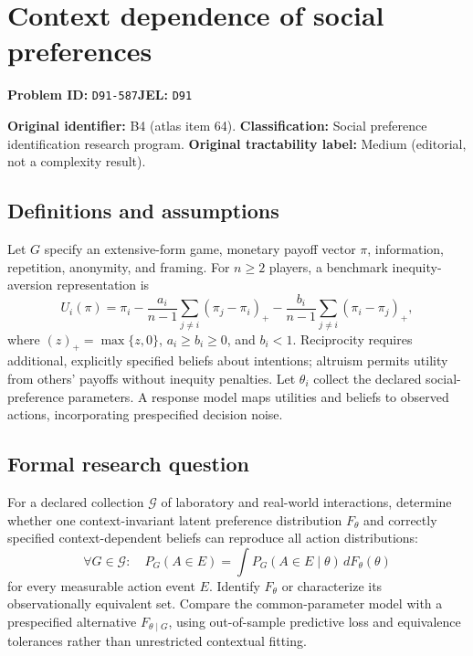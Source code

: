 \documentclass[11pt,a4paper]{article}
\begin{document}
\section*{Context dependence of social preferences}
\textbf{Problem ID:} \texttt{D91-587}\quad \textbf{JEL:} \texttt{D91}\par
\label{problem:OP-0064}
\label{atlas:prob:B4}

\noindent\textbf{Original identifier:} B4 (atlas item 64). \textbf{Classification:} Social preference identification research program. \textbf{Original tractability label:} Medium (editorial, not a complexity result).

\subsection*{Definitions and assumptions}

Let $G$ specify an extensive-form game, monetary payoff vector $\pi$, information, repetition, anonymity, and framing. For $n\geq2$ players, a benchmark inequity-aversion representation is
\[
U_i(\pi)=\pi_i-\frac{a_i}{n-1}\sum_{j\ne i}(\pi_j-\pi_i)_+
-\frac{b_i}{n-1}\sum_{j\ne i}(\pi_i-\pi_j)_+,
\]
where $(z)_+=\max\{z,0\}$, $a_i\geq b_i\geq0$, and $b_i<1$. Reciprocity requires additional, explicitly specified beliefs about intentions; altruism permits utility from others' payoffs without inequity penalties. Let $\theta_i$ collect the declared social-preference parameters. A response model maps utilities and beliefs to observed actions, incorporating prespecified decision noise.

\subsection*{Formal research question}

For a declared collection $\mathcal G$ of laboratory and real-world interactions, determine whether one context-invariant latent preference distribution $F_\theta$ and correctly specified context-dependent beliefs can reproduce all action distributions:
\[
\forall G\in\mathcal G:\quad P_G(A\in E)=\int P_G(A\in E\mid\theta)\,dF_\theta(\theta)
\]
for every measurable action event $E$. Identify $F_\theta$ or characterize its observationally equivalent set. Compare the common-parameter model with a prespecified alternative $F_{\theta\mid G}$, using out-of-sample predictive loss and equivalence tolerances rather than unrestricted contextual fitting.
\end{document}
